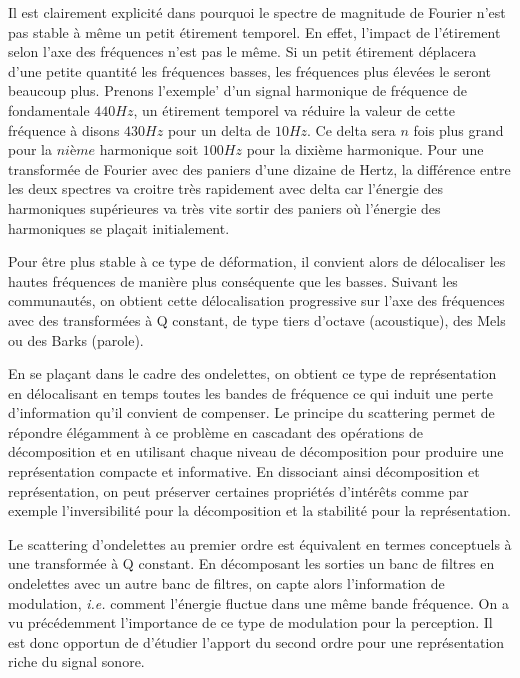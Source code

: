 Il est clairement explicité dans\cite{anden2014deep} pourquoi le spectre de magnitude de Fourier n'est pas stable à même un petit étirement temporel. En effet, l'impact de l'étirement selon l'axe des fréquences n'est pas le même. Si un petit étirement déplacera d'une petite quantité les fréquences basses, les fréquences plus élevées le seront beaucoup plus. Prenons l'exemple' d'un signal harmonique de fréquence de fondamentale $440 Hz$, un étirement temporel va réduire la valeur de cette fréquence à disons $430 Hz$ pour un delta de $10 Hz$. Ce delta sera $n$ fois plus grand pour la $nième$ harmonique soit $100 Hz$ pour la dixième harmonique. Pour une transformée de Fourier avec des paniers d'une dizaine de Hertz, la différence entre les deux spectres va croitre très rapidement avec delta car l'énergie des harmoniques supérieures va très vite sortir des paniers où l'énergie des harmoniques se plaçait initialement.

Pour être plus stable à ce type de déformation, il convient alors de \og délocaliser \fg les hautes fréquences de manière plus conséquente que les basses. Suivant les communautés, on obtient cette délocalisation progressive sur l'axe des fréquences avec des transformées à Q constant, de type tiers d'octave (acoustique), des Mels ou des Barks (parole).

En se plaçant dans le cadre des ondelettes, on obtient ce type de représentation en délocalisant en temps toutes les bandes de fréquence ce qui induit une perte d'information qu'il convient de compenser. Le principe du scattering permet de répondre élégamment à ce problème en cascadant des opérations de décomposition et en utilisant chaque niveau de décomposition pour produire une représentation compacte et informative. En dissociant ainsi décomposition et représentation, on peut préserver certaines propriétés d'intérêts comme par exemple l'inversibilité pour la décomposition et la stabilité pour la représentation.

Le scattering d'ondelettes au premier ordre est équivalent en termes conceptuels à une transformée à Q constant. En décomposant les sorties un banc de filtres en ondelettes avec un autre banc de filtres, on capte alors l'information de modulation, \textit{i.e.} comment l'énergie fluctue dans une même bande fréquence. On a vu précédemment l'importance de ce type de modulation pour la perception. Il est donc opportun de d'étudier l'apport du second ordre pour une représentation riche du signal sonore.%

